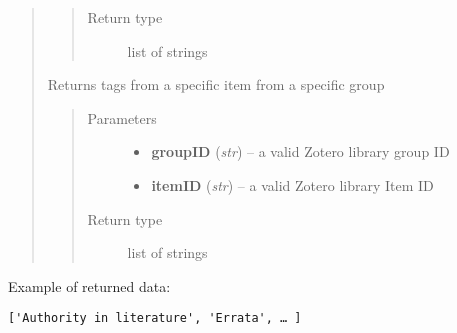 \documentclass[letterpaper,10pt,english]{sphinxmanual}
\begin{document}
\begin{quote}
\begin{fulllineitems}
\begin{quote}
\begin{description}
\item[{Return type}] \leavevmode
list of strings

\end{description}\end{quote}

\end{fulllineitems}


\begin{fulllineitems}
\label{index:pyzotero.zotero.Zotero.group_item_tags}
Returns tags from a specific item from a specific group
\begin{quote}\begin{description}
\item[{Parameters}] \leavevmode\begin{itemize}
\item {} 
\textbf{groupID} (\emph{str}) -- a valid Zotero library group ID

\item {} 
\textbf{itemID} (\emph{str}) -- a valid Zotero library Item ID

\end{itemize}

\item[{Return type}] \leavevmode
list of strings

\end{description}\end{quote}

\end{fulllineitems}

\end{quote}

Example of returned data:

\begin{Verbatim}[commandchars=\\\{\}]
['Authority in literature', 'Errata', … ]
\end{Verbatim}
\end{document}
